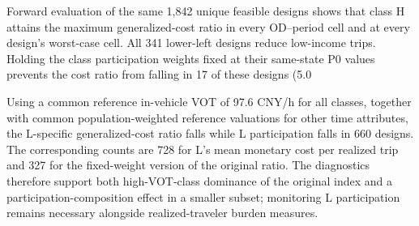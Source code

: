 Forward evaluation of the same 1,842 unique feasible designs shows that class H attains the maximum generalized-cost ratio in every OD--period cell and at every design's worst-case cell. All 341 lower-left designs reduce low-income trips. Holding the class participation weights fixed at their same-state P0 values prevents the cost ratio from falling in 17 of these designs (5.0%

Using a common reference in-vehicle VOT of 97.6 CNY/h for all classes, together with common population-weighted reference valuations for other time attributes, the L-specific generalized-cost ratio falls while L participation falls in 660 designs. The corresponding counts are 728 for L's mean monetary cost per realized trip and 327 for the fixed-weight version of the original ratio. The diagnostics therefore support both high-VOT-class dominance of the original index and a participation-composition effect in a smaller subset; monitoring L participation remains necessary alongside realized-traveler burden measures.

